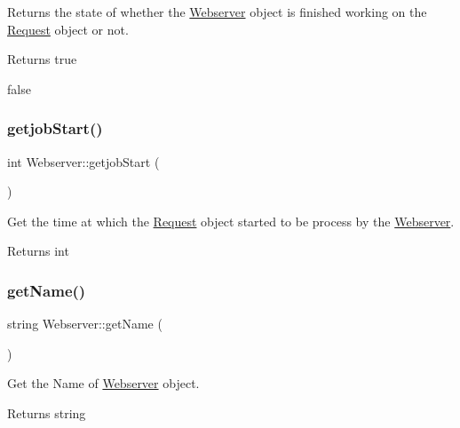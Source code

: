 Returns the state of whether the \hyperlink{classWebserver}{Webserver} object is finished working on the \hyperlink{classRequest}{Request} object or not. 

\begin{DoxyReturn}{Returns}
true 

false 
\end{DoxyReturn}
\mbox{\label{classWebserver_ad1ee2d5ae63d1d2674156eb29c3f92ee}} 
\subsubsection{\texorpdfstring{getjob\+Start()}{getjobStart()}}
{\footnotesize\ttfamily int Webserver\+::getjob\+Start (\begin{DoxyParamCaption}{ }\end{DoxyParamCaption})\hspace{0.3cm}{\ttfamily [inline]}}



Get the time at which the \hyperlink{classRequest}{Request} object started to be process by the \hyperlink{classWebserver}{Webserver}. 

\begin{DoxyReturn}{Returns}
int 
\end{DoxyReturn}
\mbox{\label{classWebserver_a7947099345655d9deceb05b37e06978c}} 
\subsubsection{\texorpdfstring{get\+Name()}{getName()}}
{\footnotesize\ttfamily string Webserver\+::get\+Name (\begin{DoxyParamCaption}{ }\end{DoxyParamCaption})\hspace{0.3cm}{\ttfamily [inline]}}



Get the Name of \hyperlink{classWebserver}{Webserver} object. 

\begin{DoxyReturn}{Returns}
string 
\end{DoxyReturn}
\mbox{\label{classWebserver_ad885e697f7623ae3b775664406f57cd0}} 
